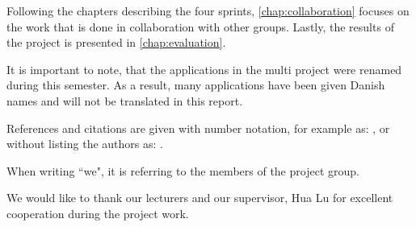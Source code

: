 Following the chapters describing the four sprints, \cref{chap:collaboration} focuses on the work that is done in collaboration with other groups.
Lastly, the results of the project is presented in \cref{chap:evaluation}.

It is important to note, that the applications in the multi project were renamed during this semester.
As a result, many applications have been given Danish names and will not be translated in this report.

References and citations are given with number notation, for example as: \citet{launcher2011}, or without listing the authors as: \cite{launcher2011}. 

When writing ``we", it is referring to the members of the project group.

We would like to thank our lecturers and our supervisor, Hua Lu for excellent cooperation during the project work.
